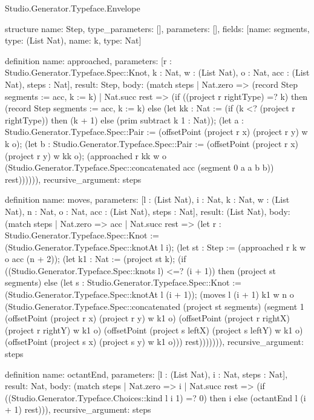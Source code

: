 \begin{lexlean}{Studio.Generator.Typeface.Envelope}
\begin{semanticmodule}
structure{
  name: Step,
  type_parameters: [],
  parameters: [],
  fields: [{name: segments, type: (List Nat)}, {name: k, type: Nat}]
}

definition{
  name: approached,
  parameters: [r : Studio.Generator.Typeface.Spec::Knot, k : Nat, w : (List Nat), o : Nat, acc : (List Nat), steps : Nat],
  result: Step,
  body: (match steps
    | Nat.zero => (record Step {segments := acc, k := k})
    | Nat.succ rest => (if ((project r rightType) =? k) then (record Step {segments := acc, k := k}) else (let kk : Nat := (if (k <? (project r rightType)) then (k + 1) else (prim subtract k 1 : Nat)); (let a : Studio.Generator.Typeface.Spec::Pair := (offsetPoint (project r x) (project r y) w k o); (let b : Studio.Generator.Typeface.Spec::Pair := (offsetPoint (project r x) (project r y) w kk o); (approached r kk w o (Studio.Generator.Typeface.Spec::concatenated acc (segment 0 a a b b)) rest)))))),
  recursive_argument: steps
}

definition{
  name: moves,
  parameters: [l : (List Nat), i : Nat, k : Nat, w : (List Nat), n : Nat, o : Nat, acc : (List Nat), steps : Nat],
  result: (List Nat),
  body: (match steps
    | Nat.zero => acc
    | Nat.succ rest => (let r : Studio.Generator.Typeface.Spec::Knot := (Studio.Generator.Typeface.Spec::knotAt l i); (let st : Step := (approached r k w o acc (n + 2)); (let k1 : Nat := (project st k); (if ((Studio.Generator.Typeface.Spec::knots l) <=? (i + 1)) then (project st segments) else (let s : Studio.Generator.Typeface.Spec::Knot := (Studio.Generator.Typeface.Spec::knotAt l (i + 1)); (moves l (i + 1) k1 w n o (Studio.Generator.Typeface.Spec::concatenated (project st segments) (segment 1 (offsetPoint (project r x) (project r y) w k1 o) (offsetPoint (project r rightX) (project r rightY) w k1 o) (offsetPoint (project s leftX) (project s leftY) w k1 o) (offsetPoint (project s x) (project s y) w k1 o))) rest))))))),
  recursive_argument: steps
}

definition{
  name: octantEnd,
  parameters: [l : (List Nat), i : Nat, steps : Nat],
  result: Nat,
  body: (match steps
    | Nat.zero => i
    | Nat.succ rest => (if ((Studio.Generator.Typeface.Choices::kind l i 1) =? 0) then i else (octantEnd l (i + 1) rest))),
  recursive_argument: steps
}


\end{semanticmodule}
\end{lexlean}
